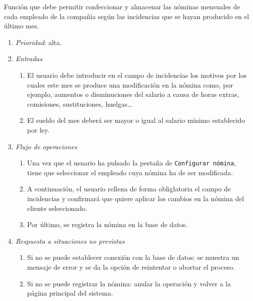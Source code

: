 	Función que debe permitir confeccionar y almacenar las nóminas mensuales de cada empleado de la compañía según las incidencias que se hayan producido en el último mes.
						
	\begin{enumerate}
		\item \textit{Prioridad}: alta.
		\item \textit{Entradas}
			\begin{enumerate}
				\item El usuario debe introducir en el campo de incidencias los motivos por los cuales este mes se produce una modificación en la nómina como, por ejemplo, aumentos o disminuciones del salario a causa de horas extras, comisiones, sustituciones, huelgas\ldots
				\item El sueldo del mes deberá ser mayor o igual al salario mínimo establecido por ley.
			\end{enumerate}
		\item \textit{Flujo de operaciones}
			\begin{enumerate}
				\item Una vez que el usuario ha pulsado la pestaña de \verb|Configurar nómina|, tiene que seleccionar el empleado cuya nómina ha de ser modificada. 
				\item A continuación, el usuario rellena de forma obliglatoria el campo de incidencias y confirmará que quiere aplicar los cambios en la nómina del cliente seleccionado.
				\item Por último, se registra la nómina en la base de datos.
			\end{enumerate}
		\item \textit{Respuesta a situaciones no previstas}
			\begin{enumerate}
				\item Si no se puede establecer conexión con la base de datos: se muestra un mensaje de error y se da la opción de reintentar o abortar el proceso.
				\item Si no se puede registrar la nómina: anular la operación y volver a la página principal del sistema.
			\end{enumerate}					
	\end{enumerate}
								
